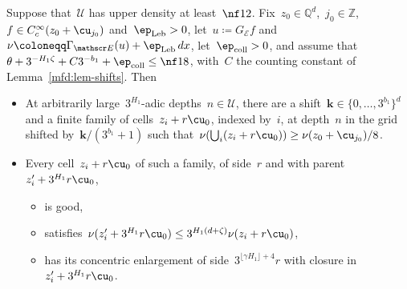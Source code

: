 \documentclass[11pt]{amsart}
\begin{document}
\begin{lemma}
\label{mfd:lem-mass}
Suppose that~$\mathcal U$ has upper density at least~$\nf12$. Fix~$z_0\in\mathbb Q^d$,~$j_0\in\mathbb Z$,~$f\in C_c^\infty(z_0+\cu_{j_0})$ and~$\ep_{\rm Leb}>0$, let~$u\coloneqq G_{\mathscr E}f$ and~$\nu\coloneqq\Gamma_{\mathscr E}(u)+\ep_{\rm Leb}\,dx$, let~$\ep_{\rm coll}>0$, and assume that~$\theta+3^{-H_1\zeta}+C3^{-b_1}+\ep_{\rm coll}\leq\nf18$, with~$C$ the counting constant of Lemma~\ref{mfd:lem-shifts}. Then
\begin{itemize}
\item At arbitrarily large~$3^{H_1}$-adic depths~$n\in\mathcal U$, there are a shift~$\mathbf k\in\{0,\ldots,3^{b_1}\}^d$ and a finite family of cells~$z_i+r\cu_0$, indexed by~$i$, at depth~$n$ in the grid shifted by~$\mathbf k/(3^{b_1}+1)$ such that~$\nu(\bigcup_i(z_i+r\cu_0))\geq\nu(z_0+\cu_{j_0})/8$.
\item Every cell~$z_i+r\cu_0$ of such a family, of side~$r$ and with parent~$z_i'+3^{H_1}r\cu_0$,
\begin{itemize}
\item is good,
\item satisfies~$\nu(z_i'+3^{H_1}r\cu_0)\leq3^{H_1(d+\zeta)}\nu(z_i+r\cu_0)$,
\item has its concentric enlargement of side~$3^{\lfloor\gamma H_1\rfloor+4}r$ with closure in~$z_i'+3^{H_1}r\cu_0$.
\end{itemize}
\end{itemize}
\end{lemma}
\end{document}
